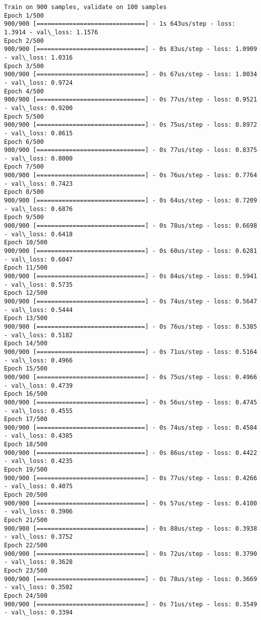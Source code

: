 \documentclass[11pt]{article}
\begin{document}
    \begin{Verbatim}[commandchars=\\\{\}]
Train on 900 samples, validate on 100 samples
Epoch 1/500
900/900 [==============================] - 1s 643us/step - loss: 1.3914 - val\_loss: 1.1576
Epoch 2/500
900/900 [==============================] - 0s 83us/step - loss: 1.0909 - val\_loss: 1.0316
Epoch 3/500
900/900 [==============================] - 0s 67us/step - loss: 1.0034 - val\_loss: 0.9724
Epoch 4/500
900/900 [==============================] - 0s 77us/step - loss: 0.9521 - val\_loss: 0.9200
Epoch 5/500
900/900 [==============================] - 0s 75us/step - loss: 0.8972 - val\_loss: 0.8615
Epoch 6/500
900/900 [==============================] - 0s 77us/step - loss: 0.8375 - val\_loss: 0.8000
Epoch 7/500
900/900 [==============================] - 0s 76us/step - loss: 0.7764 - val\_loss: 0.7423
Epoch 8/500
900/900 [==============================] - 0s 64us/step - loss: 0.7209 - val\_loss: 0.6876
Epoch 9/500
900/900 [==============================] - 0s 78us/step - loss: 0.6698 - val\_loss: 0.6418
Epoch 10/500
900/900 [==============================] - 0s 60us/step - loss: 0.6281 - val\_loss: 0.6047
Epoch 11/500
900/900 [==============================] - 0s 84us/step - loss: 0.5941 - val\_loss: 0.5735
Epoch 12/500
900/900 [==============================] - 0s 74us/step - loss: 0.5647 - val\_loss: 0.5444
Epoch 13/500
900/900 [==============================] - 0s 76us/step - loss: 0.5385 - val\_loss: 0.5182
Epoch 14/500
900/900 [==============================] - 0s 71us/step - loss: 0.5164 - val\_loss: 0.4966
Epoch 15/500
900/900 [==============================] - 0s 75us/step - loss: 0.4966 - val\_loss: 0.4739
Epoch 16/500
900/900 [==============================] - 0s 56us/step - loss: 0.4745 - val\_loss: 0.4555
Epoch 17/500
900/900 [==============================] - 0s 74us/step - loss: 0.4584 - val\_loss: 0.4385
Epoch 18/500
900/900 [==============================] - 0s 86us/step - loss: 0.4422 - val\_loss: 0.4235
Epoch 19/500
900/900 [==============================] - 0s 77us/step - loss: 0.4266 - val\_loss: 0.4075
Epoch 20/500
900/900 [==============================] - 0s 57us/step - loss: 0.4100 - val\_loss: 0.3906
Epoch 21/500
900/900 [==============================] - 0s 88us/step - loss: 0.3938 - val\_loss: 0.3752
Epoch 22/500
900/900 [==============================] - 0s 72us/step - loss: 0.3790 - val\_loss: 0.3628
Epoch 23/500
900/900 [==============================] - 0s 78us/step - loss: 0.3669 - val\_loss: 0.3502
Epoch 24/500
900/900 [==============================] - 0s 71us/step - loss: 0.3549 - val\_loss: 0.3394

\end{Verbatim}
\end{document}
